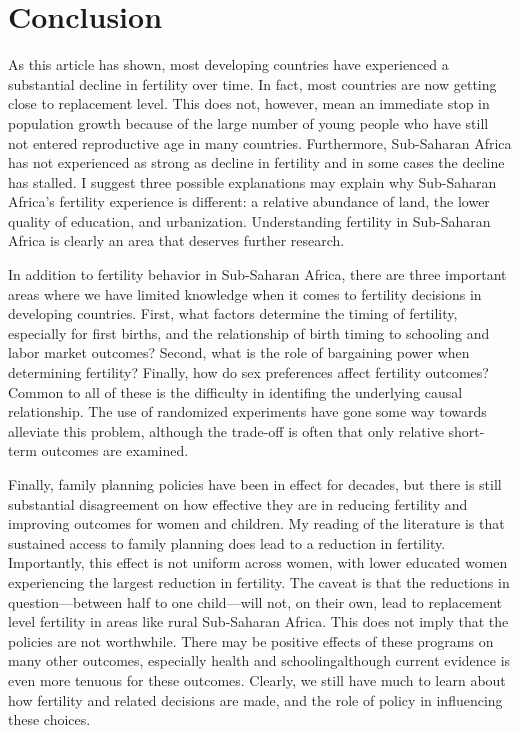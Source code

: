 \documentclass[letterpaper,12pt]{article}
\begin{document}
\section{Conclusion}\label{conclusion}

As this article has shown, most developing countries have experienced a
substantial decline in fertility over time. 
In fact, most countries are now getting close to replacement level. 
This does not, however, mean an immediate stop in population growth
because of the large number of young people who have still not entered
reproductive age in many countries. 
Furthermore, Sub-Saharan Africa has not experienced as strong as decline
in fertility and in some cases the decline has stalled. 
I suggest three possible explanations may explain why Sub-Saharan
Africa's fertility experience is different: a relative abundance of
land, the lower quality of education, and urbanization. 
Understanding fertility in Sub-Saharan Africa is clearly an area that
deserves further research.

In addition to fertility behavior in Sub-Saharan Africa, there are three
important areas where we have limited knowledge when it comes to
fertility decisions in developing countries. 
First, what factors determine the timing of fertility, especially for
first births, and the relationship of birth timing to schooling and
labor market outcomes? Second, what is the role of bargaining power when
determining fertility? Finally, how do sex preferences affect fertility
outcomes? Common to all of these is the difficulty in identifing the
underlying causal relationship. 
The use of randomized experiments have gone some way towards alleviate
this problem, although the trade-off is often that only relative
short-term outcomes are examined.

Finally, family planning policies have been in effect for decades, but
there is still substantial disagreement on how effective they are in
reducing fertility and improving outcomes for women and children. 
My reading of the literature is that sustained access to family planning
does lead to a reduction in fertility. 
Importantly, this effect is not uniform across women, with lower
educated women experiencing the largest reduction in fertility. 
The caveat is that the reductions in question---between half to one
child---will not, on their own, lead to replacement level fertility in
areas like rural Sub-Saharan Africa. 
This does not imply that the policies are not worthwhile. 
There may be positive effects of these programs on many other outcomes,
especially health and schoolingalthough current evidence is even more
tenuous for these outcomes. 
Clearly, we still have much to learn about how fertility and related
decisions are made, and the role of policy in influencing these choices.



\end{document}
